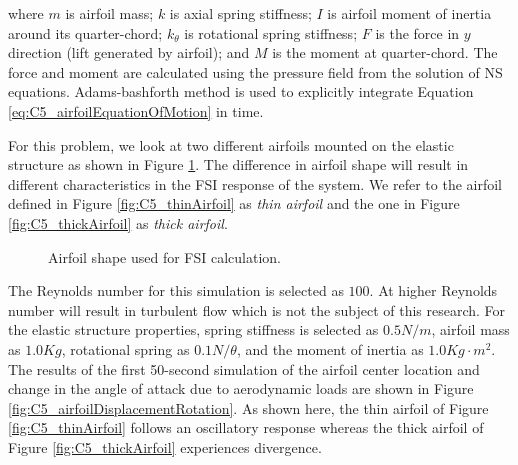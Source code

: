 %
where $m$ is airfoil mass; $k$ is axial spring stiffness; $I$ is airfoil moment of inertia around its quarter-chord; $k_\theta$ is rotational spring stiffness; $F$ is the force in $y$ direction (lift generated by airfoil); and $M$ is the moment at quarter-chord. The force and moment are calculated using the pressure field from the solution of NS equations. Adams-bashforth method is used to explicitly integrate Equation \eqref{eq:C5_airfoilEquationOfMotion} in time.

For this problem, we look at two different airfoils mounted on the elastic structure as shown in Figure \ref{fig:C5_airfoilShape}. The difference in airfoil shape will result in different characteristics in the FSI response of the system. We refer to the airfoil defined in Figure \ref{fig:C5_thinAirfoil} as \emph{thin airfoil} and the one in Figure \ref{fig:C5_thickAirfoil} as \emph{thick airfoil}.
%
\begin{figure}[H]
    \centering
    \quad
    \caption{Airfoil shape used for FSI calculation.}
    \label{fig:C5_airfoilShape}
\end{figure}
%
The Reynolds number for this simulation is selected as $100$. At higher Reynolds number will result in turbulent flow which is not the subject of this research. For the elastic structure properties, spring stiffness is selected as $0.5 N/m$, airfoil mass as $1.0 Kg$, rotational spring as $0.1 N/\theta$, and the moment of inertia as $1.0 Kg \cdot m^2$. The results of the first 50-second simulation of the airfoil center location and change in the angle of attack due to aerodynamic loads are shown in Figure \ref{fig:C5_airfoilDisplacementRotation}. As shown here, the thin airfoil of Figure \ref{fig:C5_thinAirfoil} follows an oscillatory response whereas the thick airfoil of Figure \ref{fig:C5_thickAirfoil} experiences divergence.
